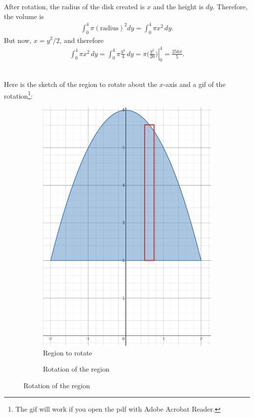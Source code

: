 	After rotation, the radius of the disk created is $x$ and the height is $dy$. Therefore, the volume is
		\begin{align*}
		\int_0^4 \pi (\text{radius})^2 dy = \int_0^4 \pi x^2 \, dy .
		\end{align*}
	But now, $x = y^2/2$, and therefore
		\begin{align*}
		\int_0^4 \pi x^2 \, dy = \int_0^4 \pi \frac{y^4}{4} \, dy =  \pi \left. \big( \frac{y^5}{20} \big) \right|_0^4 = \frac{256\pi}{5} .
		\end{align*}
		
	\newpage
	
	\\
	Here is the sketch of the region to rotate about the $x$-axis and a gif of the rotation\footnote{The gif will work if you open the pdf with Adobe Acrobat Reader.}:
		\begin{figure}[h]
		\begin{subfigure}[b]{0.45\textwidth}
		\centering
		\includegraphics[scale=0.3]{exo8_52}
		\caption{Region to rotate}
		\end{subfigure}
		\begin{subfigure}[b]{0.45\textwidth}
		\caption{Rotation of the region}
		\end{subfigure}
		\end{figure}
		
